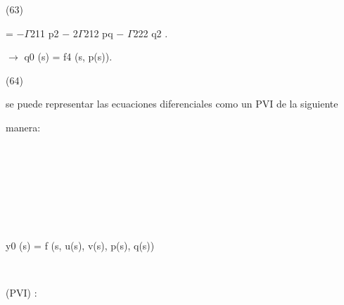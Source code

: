 \documentclass[a4paper,portrait,12pt]{article}
\begin{document}
(63)





\begin{flushleft}
= $-$$\Gamma$211 p2 $-$ 2$\Gamma$212 pq $-$ $\Gamma$222 q2 .
\end{flushleft}





\begin{flushleft}
$\rightarrow$ q0 (s) = f4 (s, p(s)).
\end{flushleft}





(64)





\begin{flushleft}
se puede representar las ecuaciones diferenciales como un PVI de la siguiente
\end{flushleft}


\begin{flushleft}
manera:
\end{flushleft}


\begin{flushleft}

\end{flushleft}


\begin{flushleft}

\end{flushleft}


\begin{flushleft}

\end{flushleft}


\begin{flushleft}

\end{flushleft}


\begin{flushleft}
y0 (s) = f (s, u(s), v(s), p(s), q(s))
\end{flushleft}


\begin{flushleft}

\end{flushleft}


\begin{flushleft}
(PVI) : 
\end{flushleft}


\begin{flushleft}

\end{flushleft}


\begin{flushleft}

\end{flushleft}
\end{document}
